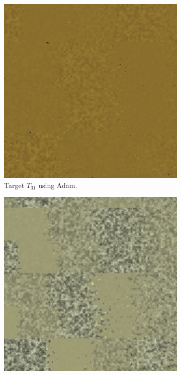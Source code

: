 \begin{figure}[hpt]
\centering
\begin{subfigure}[t]{.25\textwidth}
    \centering
    \includegraphics[width=\linewidth]{img/evaluation/M3/2 param/SBL_Adam_2param_final.png}
    \caption{Target $T_{31}$ using Adam.}
    \label{fig:M3SBLFinalRendersTwoParamAdam}
\end{subfigure}\hspace{0.7cm}
\begin{subfigure}[t]{.25\textwidth}
    \centering
    \includegraphics[width=\linewidth]{img/evaluation/M3/random/SBL_Adam_random_final.png}

\end{subfigure}
\end{figure}
